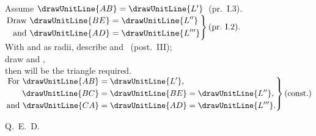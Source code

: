 \documentclass[12pt]{article}\usepackage{geometry}\geometry{a5paper,margin=1.5cm}
\begin{document}
\begin{center}
Assume $\drawUnitLine{AB}=\drawUnitLine{L'}$~(pr.~I.3).\\[4pt]
$\left.\begin{aligned}
\mbox{Draw }\drawUnitLine{BE}&=\drawUnitLine{L''}\\
\mbox{and }\drawUnitLine{AD}&=\drawUnitLine{L'''}
\end{aligned}\right\}\mbox{(pr.~I.2).}$\\[4pt]
With  and  as radii, describe
 and
~(post.~III);\\[4pt]
draw  and ,\\
then will  be the triangle required.\\[6pt]
$\left.\begin{aligned}
\mbox{For }\drawUnitLine{AB}&=\drawUnitLine{L'}\mbox{,}\\
\drawUnitLine{BC}&=\drawUnitLine{BE}=\drawUnitLine{L''}\mbox{,}\\
\mbox{and }\drawUnitLine{CA}&=\drawUnitLine{AD}=\drawUnitLine{L'''}\mbox{.}
\end{aligned}\right\}\mbox{(const.)}$
\end{center}
\begin{flushright}Q.\ E.\ D.\end{flushright}
\end{document}
